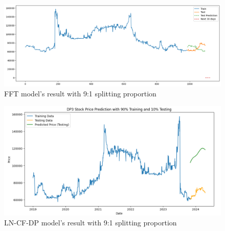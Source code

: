 \documentclass{ieeeojies}
\begin{document}
\begin{figure}[H]
  \centering
  \begin{minipage}{0.8\linewidth}
    \centering
    \includegraphics[width=\linewidth]{bibliography/Figure/DP3_FFT.png}
    \caption{FFT model's result with 9:1 splitting proportion}
    \label{fig8}
  \end{minipage}
\end{figure}

\begin{figure}[H]
  \centering
  \begin{minipage}{0.8\linewidth}
    \centering
    \includegraphics[width=\linewidth]{bibliography/Figure/DP3_LN_CF&DP.png}
    \caption{LN-CF-DP model's result with 9:1 splitting proportion}
    \label{fig8}
  \end{minipage}
\end{figure}
\end{document}
